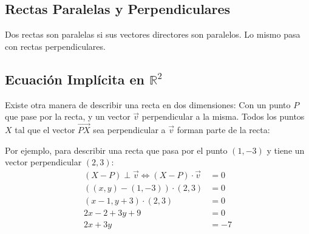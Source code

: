 \documentclass[../teoria.root.tex]{subfiles}
\begin{document}
\subsection{Rectas Paralelas y Perpendiculares}

Dos rectas son paralelas si sus vectores directores son paralelos. Lo mismo
pasa con rectas perpendiculares.

\begin{center}
\end{center}

\subsection{Ecuación Implícita en $\mathbb{R}^2$}

Existe otra manera de describir una recta en dos dimensiones: Con un punto $P$
que pase por la recta, y un vector $\vec{v}$ perpendicular a la misma. Todos
los puntos $X$ tal que el vector $\vec{PX}$ sea perpendicular a $\vec{v}$
forman parte de la recta:

\begin{center}
\end{center}

Por ejemplo, para describir una recta que pasa por el punto $(1,-3)$ y tiene un
vector perpendicular $(2,3)$:
\begin{align*}
	(X-P)\perp\vec{v}\iff(X-P)\cdot\vec{v}&=0\\
	((x,y)-(1,-3))\cdot(2,3)&=0\\
	(x-1,y+3)\cdot(2,3)&=0\\
	2x-2+3y+9&=0\\
	2x+3y&=-7
\end{align*}
\end{document}
